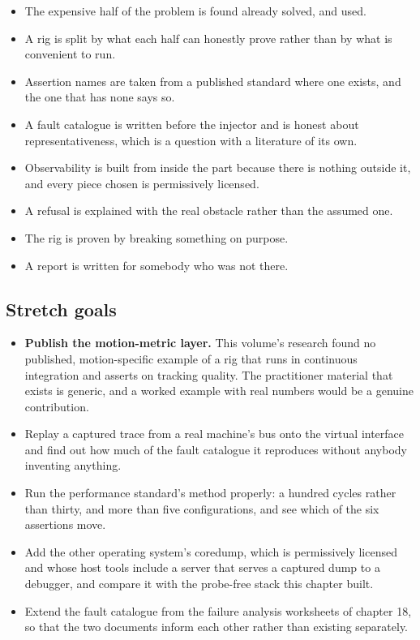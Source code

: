 \begin{itemize}
\item The expensive half of the problem is found already solved, and used.
\item A rig is split by what each half can honestly prove rather than by what is
convenient to run.
\item Assertion names are taken from a published standard where one exists, and
the one that has none says so.
\item A fault catalogue is written before the injector and is honest about
representativeness, which is a question with a literature of its own.
\item Observability is built from inside the part because there is nothing
outside it, and every piece chosen is permissively licensed.
\item A refusal is explained with the real obstacle rather than the assumed one.
\item The rig is proven by breaking something on purpose.
\item A report is written for somebody who was not there.
\end{itemize}

\subsection*{Stretch goals}

\begin{itemize}
\item \textbf{Publish the motion-metric layer.} This volume's research found no
published, motion-specific example of a rig that runs in continuous integration
and asserts on tracking quality. The practitioner material that exists is
generic, and a worked example with real numbers would be a genuine contribution.
\item Replay a captured trace from a real machine's bus onto the virtual
interface and find out how much of the fault catalogue it reproduces without
anybody inventing anything.
\item Run the performance standard's method properly: a hundred cycles rather
than thirty, and more than five configurations, and see which of the six
assertions move.
\item Add the other operating system's coredump, which is permissively licensed
and whose host tools include a server that serves a captured dump to a debugger,
and compare it with the probe-free stack this chapter built.
\item Extend the fault catalogue from the failure analysis worksheets of chapter
18, so that the two documents inform each other rather than existing separately.
\end{itemize}

